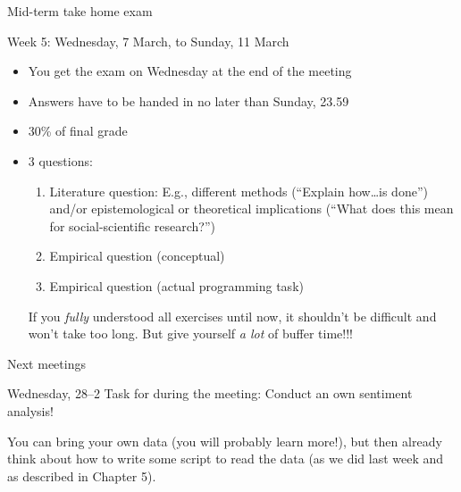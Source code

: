 \documentclass{beamer}
\begin{document}
\begin{frame}{Mid-term take home exam}
\begin{block}{Week 5: Wednesday, 7 March, to Sunday, 11 March}
\begin{itemize}
\item You get the exam on Wednesday at the end of the meeting
\item Answers have to be handed in no later than Sunday, 23.59
\item 30\% of final grade
\item 3 questions:
\begin{enumerate}
\item Literature question: E.g., different methods (``Explain how\ldots is done'') and/or epistemological or theoretical implications (``What does this mean for social-scientific research?'')
\item Empirical question (conceptual)
\item Empirical question (actual programming task)
\end{enumerate}
If you \emph{fully} understood all exercises until now, it shouldn't be difficult and won't take too long. But give yourself \emph{a lot} of buffer time!!! 
\end{itemize}
\end{block}
\end{frame}



\begin{frame}{Next meetings}
\begin{block}{Wednesday, 28--2}
Task for during the meeting: Conduct an own sentiment analysis!

You can bring your own data (you will probably learn more!), but then already think about how to write some script to read the data (as we did last week and as described in Chapter 5).
\end{block}

\end{frame}
\end{document}
